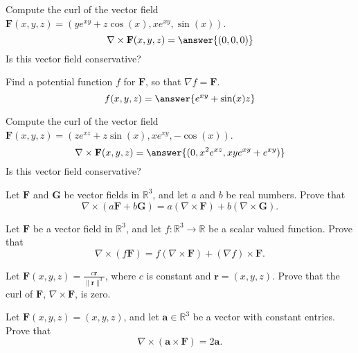 \documentclass{ximera}
\begin{document}
\begin{problem}
Compute the curl of the vector field $\mathbf{F}(x,y,z) = (ye^{xy}+z\cos(x), xe^{xy},\sin(x))$.
\[
\nabla\times\mathbf{F}(x,y,z) = \answer{(0,0,0)}
\]
Is this vector field conservative?
\begin{multipleChoice}
\end{multipleChoice}
\begin{problem}
Find a potential function $f$ for $\mathbf{F}$, so that $\nabla f = \mathbf{F}$.
\[
f(x,y,z) = \answer{e^{xy}+\sin(x)z}
\]
\end{problem}
\end{problem}

\begin{problem}
Compute the curl of the vector field $\mathbf{F}(x,y,z) = (ze^{xz}+z\sin(x), xe^{xy},-\cos(x))$.
\[
\nabla\times\mathbf{F}(x,y,z) = \answer{(0,x^2e^{xz},xye^{xy}+e^{xy})}
\]
Is this vector field conservative?
\begin{multipleChoice}
\end{multipleChoice}
\end{problem}



\begin{problem}
Let $\mathbf{F}$ and $\mathbf{G}$ be vector fields in $\mathbb{R}^3$, and let $a$ and $b$ be real numbers. Prove that 
\[
\nabla\times(a\mathbf{F}+b\mathbf{G}) = a(\nabla\times\mathbf{F})+b(\nabla\times\mathbf{G}).
\]
\end{problem}

\begin{problem}
Let $\mathbf{F}$ be a vector field in $\mathbb{R}^3$, and let $f:\mathbb{R}^3\rightarrow\mathbb{R}$ be a scalar valued function. Prove that
\[
\nabla\times (f\mathbf{F}) = f(\nabla\times\mathbf{F})+(\nabla f)\times \mathbf{F}.
\]
\end{problem}

\begin{problem}
Let $\mathbf{F}(x,y,z) = \frac{c\mathbf{r}}{\|\mathbf{r}\|^3}$, where $c$ is constant and $\mathbf{r} = (x,y,z)$. Prove that the curl of $\mathbf{F}$, $\nabla\times\mathbf{F}$, is zero.
\end{problem}

\begin{problem}
Let $\mathbf{F}(x,y,z) = (x,y,z)$, and let $\mathbf{a}\in\mathbb{R}^3$ be a vector with constant entries. Prove that 
\[
\nabla\times(\mathbf{a}\times\mathbf{F}) = 2\mathbf{a}.
\]
\end{problem}
\end{document}
